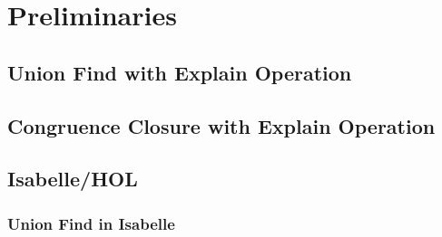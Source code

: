 
\chapter{Preliminaries}\label{chapter:preliminaries}

\section{Union Find with Explain Operation}

\section{Congruence Closure with Explain Operation}

\section{Isabelle/HOL}

\subsection{Union Find in Isabelle}
